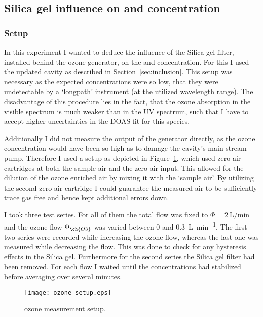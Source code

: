 \subsection{Silica gel influence on  and  concentration}
\label{sec:silica}

\subsubsection{Setup}
\label{sec:silica-setup}

In this experiment I wanted to deduce the influence of the Silica gel
filter, installed behind the ozone generator, on the  and
 concentration. For this I used the updated cavity as
described in Section~\ref{sec:inclusion}. This setup was necessary as
the expected  concentrations were so low, that they were
undetectable by a `longpath' instrument (at the utilized wavelength
range). The disadvantage of this procedure lies in the fact, that the
ozone absorption in the visible spectrum is much weaker than in the UV
spectrum, such that I have to accept higher uncertainties in the DOAS
fit for this species.

Additionally I did not measure the output of the generator directly,
as the ozone concentration would have been so high as to damage the
cavity's main stream pump. Therefore I used a setup as depicted in
Figure~\ref{fig:ozone-flow-setup}, which used zero air cartridges at
both the sample air and the zero air input. This allowed for the
dilution of the ozone enriched air by mixing it with the `sample
air'. By utilizing the second zero air cartridge I could guarantee the
measured air to be sufficiently trace gas free and hence kept
additional errors down.

I took three test series. For all of them the total flow was fixed to
$\Phi = \SI{2}{\liter\per\minute}$ and the ozone flow $\Phi_{\ch{O3}}$
was varied between \num{0} and \SI{0.3}{\liter\per\minute}. The first
two series were recorded while increasing the ozone flow, whereas the
last one was measured while decreasing the flow. This was done to
check for any hysteresis effects in the Silica gel. Furthermore for
the second series the Silica gel filter had been removed. For each
flow I waited until the concentrations had stabilized before
averaging over several minutes.

\begin{figure}[htbp]
  \centering
  \texttt{[image: ozone\_setup.eps]}
  \caption{ozone measurement setup.}
  \label{fig:ozone-flow-setup}
\end{figure}

